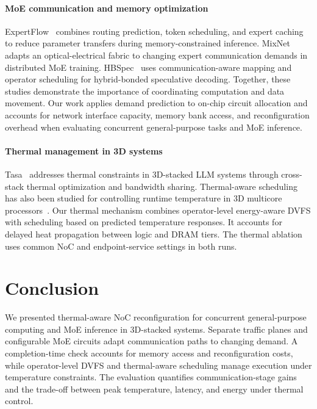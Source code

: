 \documentclass[conference,10pt]{IEEEtran}
\begin{document}
\paragraph{MoE communication and memory optimization}
ExpertFlow~\cite{he2026expertflow} combines routing prediction, token
scheduling, and expert caching to reduce parameter transfers during
memory-constrained inference. MixNet~\cite{liao2025mixnet} adapts an
optical-electrical fabric to changing expert communication demands in
distributed MoE training. HBSpec~\cite{wang2026hbspec} uses
communication-aware mapping and operator scheduling for hybrid-bonded
speculative decoding. Together, these studies demonstrate the importance
of coordinating computation and data movement. Our work applies demand
prediction to on-chip circuit allocation and accounts for network interface
capacity, memory bank access, and reconfiguration overhead when evaluating
concurrent general-purpose tasks and MoE inference.

\paragraph{Thermal management in 3D systems}
Tasa~\cite{he2025tasa} addresses thermal constraints in 3D-stacked LLM
systems through cross-stack thermal optimization and bandwidth sharing.
Thermal-aware scheduling has also been studied for controlling runtime
temperature in 3D multicore processors~\cite{tsai2016thermal}.
Our thermal mechanism combines operator-level energy-aware DVFS with
scheduling based on predicted temperature responses. It accounts for
delayed heat propagation between logic and DRAM tiers. The thermal
ablation uses common NoC and endpoint-service settings in both runs.

\par\addvspace{5pt}
\section{Conclusion}
\label{sec:conclusion}

We presented thermal-aware NoC reconfiguration for concurrent
general-purpose computing and MoE inference in 3D-stacked systems.
Separate traffic planes and configurable MoE circuits adapt communication
paths to changing demand. A completion-time check accounts for memory
access and reconfiguration costs, while operator-level DVFS and
thermal-aware scheduling manage execution under temperature constraints.
The evaluation quantifies communication-stage gains and the trade-off
between peak temperature, latency, and energy under thermal control.

\clearpage
\balance


\end{document}
